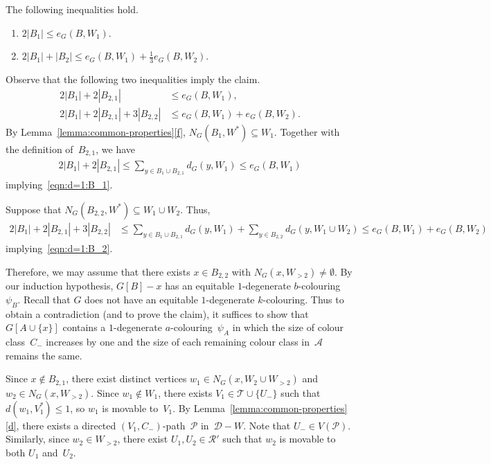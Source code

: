\documentclass[10pt,a4paper]{amsart}
\begin{document}
\begin{claim} \label{clm:d=1:B}
The following inequalities hold.
\begin{enumerate}[label={\rm(\alph*)},start=1]
	\item $2|B_1| \le e_G(B,W_1)$. \label{itm:d=1:B1}
	\item $2|B_1| + |B_2| \le e_G(B,W_1) +\frac13 e_G(B, W_2)$.\label{itm:d=1:B2}
\end{enumerate}
\end{claim}

\begin{proofclaim}
Observe that the following two inequalities imply the claim.
\begin{align}
		2|B_1| + 2 |B_{2,1}| &\le e_G(B,W_1), \label{eqn:d=1:B_1}\\
	2|B_1| + 2 |B_{2,1}| + 3|B_{2,2}| & \le e_G(B,W_1)+e_G(B,W_2). \label{eqn:d=1:B_2}
\end{align}
By Lemma~\ref{lemma:common-properties}\ref{f},  $N_G(B_1, W^*) \subseteq W_1$.
Together with the definition of~$B_{2,1}$, we have
\begin{align*}
	2|B_1| + 2 |B_{2,1}| \le \sum_{y \in B_1 \cup B_{2,1} } d_{G}(y,W_1) \le e_G(B,W_1)
\end{align*}
implying~\eqref{eqn:d=1:B_1}.

Suppose that $N_G(B_{2,2}, W^*) \subseteq W_1 \cup W_2$.
Thus,
\begin{align*}
	2|B_1| + 2 |B_{2,1}| + 3|B_{2,2}| & \le \sum_{y \in B_1 \cup B_{2,1} } d_{G}(y,W_1) +  \sum_{y \in B_{2,2} } d_{G}(y,W_1 \cup W_2)
	 \le e_G(B,W_1)+e_G(B,W_2)
\end{align*}
implying~\eqref{eqn:d=1:B_2}.

Therefore, we may assume that there exists $x \in B_{2,2}$ with $N_G(x,W_{>2}) \ne \emptyset$.
By our induction hypothesis, $G[B]-x$ has an equitable $1$-degenerate $b$-colouring~$\psi_B$.
Recall that $G$ does not have an equitable $1$-degenerate $k$-colouring.
Thus to obtain a contradiction (and to prove the claim), it suffices to show that $G[A \cup \{x\}]$ contains a $1$-degenerate $a$-colouring~$\psi_A$ in which the size of colour class~$C_-$ increases by one and the size of each remaining colour class in~$\mathcal{A}$ remains the same.


Since $x \notin B_{2,1}$, there exist distinct vertices $w_1 \in N_G(x,W_2 \cup W_{>2})$ and $w_2 \in N_G(x, W_{>2})$.
Since $w_1 \notin W_1$, there exists $V_1 \in \mathcal{T} \cup \{U_-\}$ such that $d(w_1, V^*_1) \le 1$, so $w_1$ is movable to~$V_1$.
By Lemma~\ref{lemma:common-properties}\ref{d}, there exists a directed $(V_1, C_-)$-path~$\mathcal{P}$ in~$\mathcal{D}-W$.
Note that $U_- \in V(\mathcal{P})$.
Similarly, since $w_2 \in W_{>2}$, there exist $U_1,U_2 \in \mathcal{R}'$ such that $w_2$ is movable to both $U_1$ and~$U_2$.




\end{proofclaim}
\end{document}
